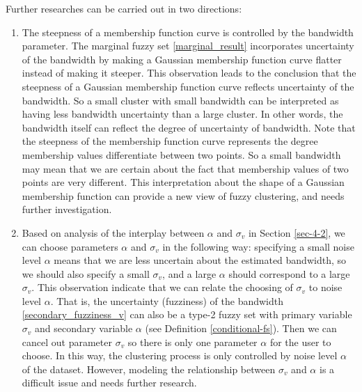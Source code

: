 \documentclass[journal]{IEEEtran}
\theoremstyle{definition}
\begin{document}
Further researches can be carried out in two directions:
\begin{enumerate}
\item The steepness of a membership function curve is controlled by the bandwidth parameter. The marginal fuzzy set \ref{marginal_result} incorporates uncertainty of the bandwidth by making a Gaussian membership function curve flatter instead of making it steeper. 
This observation leads to the conclusion that the steepness of a Gaussian membership function curve reflects uncertainty of the bandwidth. So a small cluster with small bandwidth can be interpreted as having less bandwidth uncertainty than a large cluster. In other words, the bandwidth itself can reflect the degree of uncertainty of bandwidth. Note that the steepness of the membership function curve represents the degree membership values differentiate between two points. So a small bandwidth may mean that we are certain about the fact that membership values of two points are very different. This interpretation about the shape of a Gaussian  membership function can provide a new view of fuzzy clustering, and needs further investigation.
\item Based on analysis of the interplay between $\alpha$ and $\sigma_v$ in Section \ref{sec-4-2}, we can choose parameters $\alpha$ and $\sigma_v$ in the following way: specifying a small noise level $\alpha$ means that we are less uncertain about the estimated bandwidth, so we should also specify a small $\sigma_v$, and a large $\alpha$ should correspond to a large $\sigma_v$. This observation indicate that we can relate the choosing of $\sigma_v$ to noise level $\alpha$. That is, the uncertainty (fuzziness) of the bandwidth \eqref{secondary_fuzziness_v} can also be a type-2 fuzzy set with primary variable $\sigma_v$ and secondary variable $\alpha$ (see Definition \ref{conditional-fs}). Then we can cancel out  parameter $\sigma_v$ so there is only one parameter $\alpha$ for the user to choose. In this way, the clustering process is only controlled by noise level $\alpha$ of the dataset. However, modeling the relationship between $\sigma_v$ and $\alpha$ is a difficult issue and needs further research.
\end{enumerate}


\end{document}

